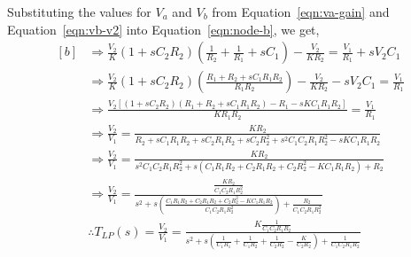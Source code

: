 \documentclass{lab_sheet}
\newcommand\ddfrac[2]{\frac{\displaystyle #1}{\displaystyle #2}}
\begin{document}
    Substituting the values for $V_a$ and $V_b$ from Equation~\ref{eqn:va-gain} and Equation~\ref{eqn:vb-v2} into Equation~\ref{eqn:node-b}, we get,
    \begin{equation}
        \begin{aligned}[b]
            &\Rightarrow \frac{V_2}{K}\left(1+sC_2R_2\right) \left(\frac{1}{R_2}+\frac{1}{R_1}+sC_1\right)-\frac{V_2}{KR_2}=\frac{V_1}{R_1}+sV_2C_1\\
            &\Rightarrow \frac{V_2}{K}\left(1+sC_2R_2\right) \left(\frac{R_1+R_2+sC_1R_1R_2}{R_1R_2}\right)-\frac{V_2}{KR_2}-sV_2C_1=\frac{V_1}{R_1}\\
            &\Rightarrow \frac{V_2\left[\left(1+sC_2R_2\right)\left(R_1+R_2+sC_1R_1R_2\right)-R_1-sKC_1R_1R_2\right]}{KR_1R_2}=\frac{V_1}{R_1}\\
            &\Rightarrow \frac{V_2}{V_1}=\frac{KR_2}{R_2+sC_1R_1R_2+sC_2R_1R_2+sC_2R_2^2+s^2C_1C_2R_1R_2^2-sKC_1R_1R_2}\\
            &\Rightarrow \frac{V_2}{V_1}=\frac{KR_2}{s^2C_1C_2R_1R_2^2+s\left(C_1R_1R_2+C_2R_1R_2+C_2R_2^2-KC_1R_1R_2\right)+R_2}\\
            &\Rightarrow \frac{V_2}{V_1}=\ddfrac{\frac{KR_2}{C_1C_2R_1R_2^2}}{s^2+s\left(\frac{C_1R_1R_2+C_2R_1R_2+C_2R_2^2-KC_1R_1R_2}{C_1C_2R_1R_2^2}\right)+\frac{R_2}{C_1C_2R_1R_2^2}}\\
            &\therefore T_{LP}(s)= \frac{V_2}{V_1}=\ddfrac{K\frac{1}{C_1C_2R_1R_2}}{s^2+s\left(\frac{1}{C_1R_1}+\frac{1}{C_1R_2}+\frac{1}{C_2R_2}-\frac{K}{C_2R_2}\right)+\frac{1}{C_1C_2R_1R_2}}
        \end{aligned}
        \label{eqn:tfr-final}
    \end{equation}
\end{document}
